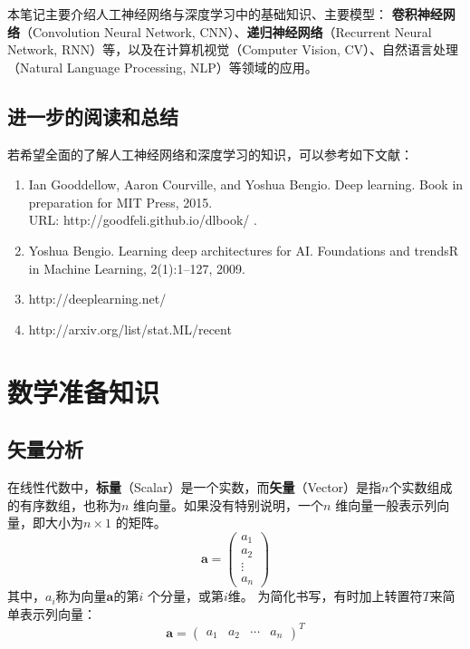 \documentclass[11pt,fleqn, UTF8]{ctexbook} %
\begin{document}
本笔记主要介绍人工神经网络与深度学习中的基础知识、主要模型：\textbf{ 卷积神经网络}（Convolution Neural Network, CNN）、\textbf{递归神经网络}（Recurrent Neural Network, RNN）等，以及在计算机视觉（Computer Vision, CV）、自然语言处理（Natural Language Processing, NLP）等领域的应用。


\section{进一步的阅读和总结}
若希望全面的了解人工神经网络和深度学习的知识，可以参考如下文献：
\begin{enumerate}
  \item Ian Gooddellow, Aaron Courville, and Yoshua Bengio. Deep learning. Book in preparation for MIT Press, 2015. \\URL: http://goodfeli.github.io/dlbook/
      \cite{Goodfellow-et-al-2015-Book}.
  \item Yoshua Bengio. Learning deep architectures for AI. Foundations and trendsR in Machine Learning, 2(1):1–127, 2009\cite{bengio2009learning}.
  \item http://deeplearning.net/
  \item http://arxiv.org/list/stat.ML/recent
\end{enumerate}

\chapter{数学准备知识}

\section{矢量分析}

在线性代数中，\textbf{标量}（Scalar）是一个实数，而\textbf{矢量}（Vector）是指$n$个实数组成的有序数组，也称为$n$ 维向量。如果没有特别说明，一个$n$ 维向量一般表示列向量，即大小为$n \times 1$ 的矩阵。
\begin{equation}\label{2.1}
  \boldsymbol{a}=\begin{pmatrix}
a_{1}\\
a_{2}\\
\vdots\\
a_{n}
\end{pmatrix}
\end{equation}
其中，$a_i$称为向量$\boldsymbol{a}$的第$i$ 个分量，或第$i$维。
为简化书写，有时加上转置符$T$来简单表示列向量：
\begin{equation}\label{2.2}
  \boldsymbol{a}=\begin{pmatrix}
a_{1} & a_{2} & \cdots & a_{n}\end{pmatrix}^T
\end{equation}
\end{document}
